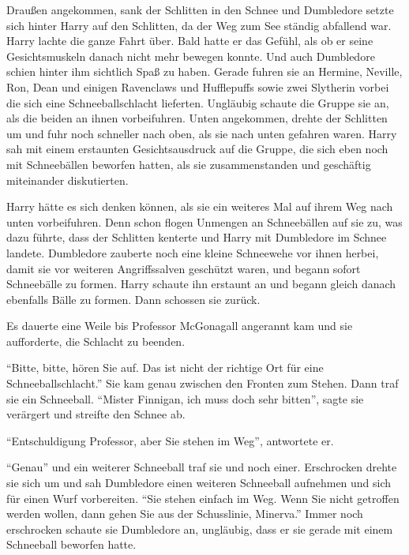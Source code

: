 Draußen angekommen, sank der Schlitten in den Schnee und Dumbledore setzte sich hinter Harry auf den Schlitten, da der Weg zum See ständig abfallend war. Harry lachte die ganze Fahrt über. Bald hatte er das Gefühl, als ob er seine Gesichtsmuskeln danach nicht mehr bewegen konnte. Und auch Dumbledore schien hinter ihm sichtlich Spaß zu haben. Gerade fuhren sie an Hermine, Neville, Ron, Dean und einigen Ravenclaws und Hufflepuffs sowie zwei Slytherin vorbei die sich eine Schneeballschlacht lieferten. Ungläubig schaute die Gruppe sie an, als die beiden an ihnen vorbeifuhren. Unten angekommen, drehte der Schlitten um und fuhr noch schneller nach oben, als sie nach unten gefahren waren. Harry sah mit einem erstaunten Gesichtsausdruck auf die Gruppe, die sich eben noch mit Schneebällen beworfen hatten, als sie zusammenstanden und geschäftig miteinander diskutierten.

Harry hätte es sich denken können, als sie ein weiteres Mal auf ihrem Weg nach unten vorbeifuhren. Denn schon flogen Unmengen an Schneebällen auf sie zu, was dazu führte, dass der Schlitten kenterte und Harry mit Dumbledore im Schnee landete. Dumbledore zauberte noch eine kleine Schneewehe vor ihnen herbei, damit sie vor weiteren Angriffssalven geschützt waren, und begann sofort Schneebälle zu formen. Harry schaute ihn erstaunt an und begann gleich danach ebenfalls Bälle zu formen. Dann schossen sie zurück.

Es dauerte eine Weile bis Professor McGonagall angerannt kam und sie aufforderte, die Schlacht zu beenden.

\enquote{Bitte, bitte, hören Sie auf. Das ist nicht der richtige Ort für eine Schneeballschlacht.} Sie kam genau zwischen den Fronten zum Stehen. Dann traf sie ein Schneeball. \enquote{Mister Finnigan, ich muss doch sehr bitten}, sagte sie verärgert und streifte den Schnee ab.

\enquote{Entschuldigung Professor, aber Sie stehen im Weg}, antwortete er.

\enquote{Genau} und ein weiterer Schneeball traf sie und noch einer. Erschrocken drehte sie sich um und sah Dumbledore einen weiteren Schneeball aufnehmen und sich für einen Wurf vorbereiten. \enquote{Sie stehen einfach im Weg. Wenn Sie nicht getroffen werden wollen, dann gehen Sie aus der Schusslinie, Minerva.} Immer noch erschrocken schaute sie Dumbledore an, ungläubig, dass er sie gerade mit einem Schneeball beworfen hatte.

